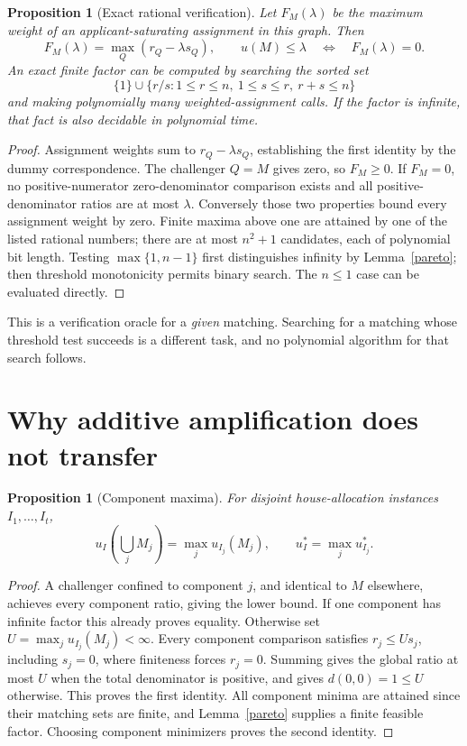 \documentclass[11pt]{article}
\newtheorem{proposition}[theorem]{Proposition}
\theoremstyle{remark}
\begin{document}
\begin{proposition}[Exact rational verification]\label{oracle}
Let $F_M(\lambda)$ be the maximum weight of an applicant-saturating
assignment in this graph. Then
\[
 F_M(\lambda)=\max_Q(r_Q-\lambda s_Q),\qquad
 u(M)\leq\lambda\quad\Longleftrightarrow\quad F_M(\lambda)=0.
\]
An exact finite factor can be computed by searching the sorted set
\[
 \{1\}\cup\{r/s:1\leq r\leq n,\ 1\leq s\leq r,\ r+s\leq n\}
\]
and making polynomially many weighted-assignment calls. If the factor
is infinite, that fact is also decidable in polynomial time.
\end{proposition}
\begin{proof}
Assignment weights sum to $r_Q-\lambda s_Q$, establishing the first
identity by the dummy correspondence. The challenger $Q=M$ gives zero,
so $F_M\geq0$. If $F_M=0$, no positive-numerator zero-denominator
comparison exists and all positive-denominator ratios are at most
$\lambda$. Conversely those two properties bound every assignment
weight by zero. Finite maxima above one are attained by one of the
listed rational numbers; there are at most $n^2+1$ candidates, each of
polynomial bit length. Testing $\max\{1,n-1\}$ first distinguishes
infinity by Lemma~\ref{pareto}; then threshold monotonicity permits
binary search. The $n\leq1$ case can be evaluated directly.
\end{proof}

This is a verification oracle for a \emph{given} matching. Searching
for a matching whose threshold test succeeds is a different task, and
no polynomial algorithm for that search follows.

\section{Why additive amplification does not transfer}
\begin{proposition}[Component maxima]\label{product}
For disjoint house-allocation instances $I_1,\ldots,I_t$,
\[
 u_I\left(\bigcup_jM_j\right)=\max_j u_{I_j}(M_j),\qquad
 u_I^*=\max_j u_{I_j}^*.
\]
\end{proposition}
\begin{proof}
A challenger confined to component $j$, and identical to $M$ elsewhere,
achieves every component ratio, giving the lower bound. If one component
has infinite factor this already proves equality. Otherwise set
$U=\max_j u_{I_j}(M_j)<\infty$. Every component comparison satisfies
$r_j\leq U s_j$, including $s_j=0$, where finiteness forces $r_j=0$.
Summing gives the global ratio at most $U$ when the total denominator
is positive, and gives $d(0,0)=1\leq U$ otherwise. This proves the first
identity. All component minima are attained since their matching sets
are finite, and Lemma~\ref{pareto} supplies a finite feasible factor.
Choosing component minimizers proves the second identity.
\end{proof}
\end{document}

